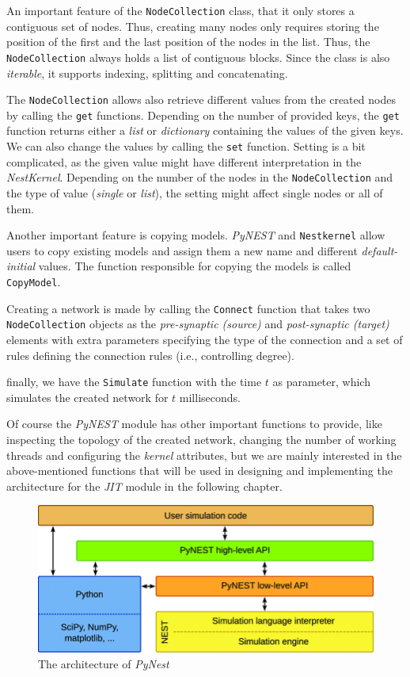 An important feature of the \texttt{NodeCollection} class, that it only stores a contiguous set of nodes. Thus, creating many nodes only requires storing the position of the first and the last position of the nodes in the list. Thus, the \texttt{NodeCollection} always holds a list of contiguous blocks. Since the class is also \emph{iterable}, it supports indexing, splitting and concatenating.  


The \texttt{NodeCollection} allows also retrieve different values from the created nodes by calling the \texttt{get} functions. Depending on the number of provided keys, the \texttt{get} function returns either a \emph{list} or \emph{dictionary} containing the values of the given keys. We can also change the values by calling the \texttt{set} function. Setting is a bit complicated, as the given value might have different interpretation in the \emph{NestKernel}. Depending on the number of the nodes in the \texttt{NodeCollection} and the type of value (\emph{single} or \emph{list}), the setting might affect single nodes or all of them.

Another important feature is copying models. \emph{PyNEST} and \texttt{Nestkernel} allow users to copy existing models and assign them a new name and different \emph{default-initial} values. The function responsible for copying the models is called \texttt{CopyModel}.

Creating a network is made by calling the \texttt{Connect} function that takes two \texttt{NodeCollection} objects as the \emph{pre-synaptic (source)} and \emph{post-synaptic (target)} elements with extra parameters specifying the type of the connection and a set of rules defining the connection rules (i.e., controlling degree).

finally, we have the \texttt{Simulate} function  with the time $t$ as parameter, which simulates the created network for $t$ milliseconds.

Of course the \emph{PyNEST} module has other important functions to provide, like inspecting the topology of the created network, changing the number of working threads and configuring the \emph{kernel} attributes, but we are mainly interested in the above-mentioned functions that will be used in designing and implementing the architecture for the \emph{JIT} module in the following chapter.
 
 
\vspace{0.5cm}
\begin{figure}[ht!]
\centering
\includegraphics[width=1\textwidth,height=1\textheight,keepaspectratio]{src/pic/The-architecture-of-PyNEST-The-lowest-level-is-the-simulation-engine-It-is-used-by.png}
\caption{The architecture of \emph{PyNest}}
\label{fig:pynest}
\end{figure}





